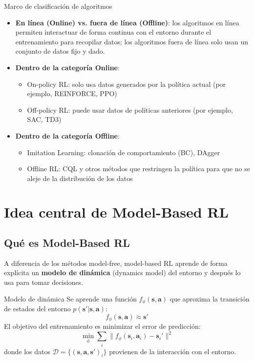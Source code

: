\documentclass[a4paper]{article}
\begin{document}
\begin{importantbox}{Marco de clasificación de algoritmos}
\begin{itemize}
    \item \textbf{En línea (Online) vs. fuera de línea (Offline)}: los algoritmos en línea permiten interactuar de forma continua con el entorno durante el entrenamiento para recopilar datos; los algoritmos fuera de línea solo usan un conjunto de datos fijo y dado.
    \item \textbf{Dentro de la categoría Online}:
    \begin{itemize}
        \item On-policy RL: solo usa datos generados por la política actual (por ejemplo, REINFORCE, PPO)
        \item Off-policy RL: puede usar datos de políticas anteriores (por ejemplo, SAC, TD3)
    \end{itemize}
    \item \textbf{Dentro de la categoría Offline}:
    \begin{itemize}
        \item Imitation Learning: clonación de comportamiento (BC), DAgger
        \item Offline RL: CQL y otros métodos que restringen la política para que no se aleje de la distribución de los datos
    \end{itemize}
\end{itemize}
\end{importantbox}

\section{Idea central de Model-Based RL}

\subsection{Qué es Model-Based RL}

A diferencia de los métodos model-free, model-based RL aprende de forma explícita un \textbf{modelo de dinámica} (dynamics model) del entorno y después lo usa para tomar decisiones.

\begin{importantbox}{Modelo de dinámica}
Se aprende una función $f_\phi(\mathbf{s}, \mathbf{a})$ que aproxima la transición de estados del entorno $p(\mathbf{s}' | \mathbf{s}, \mathbf{a})$:
$$f_\phi(\mathbf{s}, \mathbf{a}) \approx \mathbf{s}'$$
El objetivo del entrenamiento es minimizar el error de predicción:
$$\min_\phi \sum_i \|f_\phi(\mathbf{s}_i, \mathbf{a}_i) - \mathbf{s}_i'\|^2$$
donde los datos $\mathcal{D} = \{(\mathbf{s}, \mathbf{a}, \mathbf{s}')_i\}$ provienen de la interacción con el entorno.
\end{importantbox}
\end{document}

